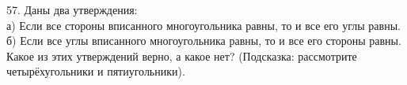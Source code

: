 57. Даны два утверждения:\\
а) Если все стороны вписанного многоугольника равны, то и все его углы равны.\\
б) Если все углы вписанного многоугольника равны, то и все его стороны равны.\\
Какое из этих утверждений верно, а какое нет? (Подсказка: рассмотрите четырёхугольники и пятиугольники).\\
